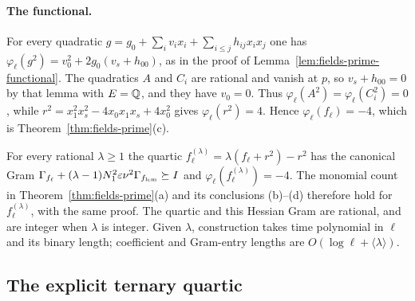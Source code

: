 \paragraph{The functional.}
For every quadratic $g=g_0+\sum_iv_ix_i+\sum_{i\le j}h_{ij}x_ix_j$ one
has $\varphi_\ell(g^2)=v_0^2+2g_0(v_s+h_{00})$, as in the proof of
Lemma~\ref{lem:fields-prime-functional}. The quadratics $A$ and $C_i$ are
rational and vanish at $p$, so $v_s+h_{00}=0$ by that lemma with $E=\mathbb Q$,
and they have $v_0=0$. Thus $\varphi_\ell(A^2)=\varphi_\ell(C_i^2)=0$, while
$r^2=x_1^2x_s^2-4x_0x_1x_s+4x_0^2$ gives $\varphi_\ell(r^2)=4$. Hence
$\varphi_\ell(f_\ell)=-4$, which is Theorem~\ref{thm:fields-prime}(c).

\begin{remark}
\label{rem:fields-prime-scales}
For every rational $\lambda\ge1$ the quartic
$f_\ell^{(\lambda)}=\lambda(f_\ell+r^2)-r^2$ has the canonical Gram
$\Gamma_{f_\ell}+(\lambda-1)N_1^2\varepsilon\nu^2\Gamma_{f_{\rm lem}}\succeq I$
and $\varphi_\ell(f_\ell^{(\lambda)})=-4$. The monomial count in
Theorem~\ref{thm:fields-prime}(a) and its conclusions (b)--(d) therefore hold
for $f_\ell^{(\lambda)}$, with the same proof. The quartic and this Hessian
Gram are rational, and are integer when $\lambda$ is integer. Given
$\lambda$, construction takes time polynomial in $\ell$ and its binary
length; coefficient and Gram-entry lengths are
$O(\log\ell+\langle\lambda\rangle)$.
\end{remark}

\subsection{The explicit ternary quartic}
\label{app:fields-ternary}

